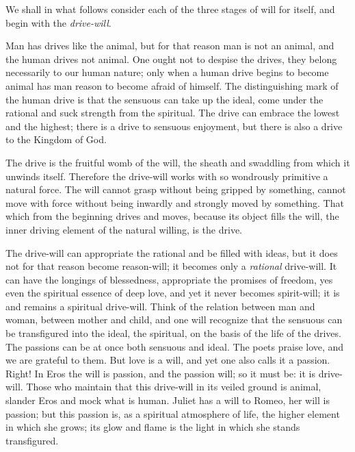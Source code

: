 \documentclass[12pt,a4paper,openany]{book}
\newcommand{\opage}[1]{\marginnote{\footnotesize\textit{[#1]}}}
\begin{document}
We shall in what follows consider each of the three
stages of will for itself, and begin with the \emph{drive-will}.

Man has drives like the animal, but for that reason
man is not an animal, and the human drives not
animal. One ought not to despise the drives, they belong necessarily
to our human nature; only when a human
drive begins to become animal has man reason
to become afraid of himself. The distinguishing mark of the human
drive is that the sensuous can take up the ideal,
come under the rational and suck strength from the spiritual.
The drive can embrace the lowest and the highest; there
is a drive to sensuous enjoyment, but there is also
a drive to the Kingdom of God.

The drive is the fruitful womb of the will, the sheath and
swaddling from which it unwinds itself. Therefore the drive-will works
with so wondrously primitive a natural force. The will cannot
grasp without being gripped by something, cannot move
\setcounter{footnote}{0}%
\opage{17}with force without being inwardly and strongly moved by
something. That which from the beginning drives and moves,
because its object fills the will, the inner driving element of the natural willing,
is the drive.

The drive-will can appropriate the rational and be filled
with ideas, but it does not for that reason become reason-will; it
becomes only a \emph{rational} drive-will. It can have
the longings of blessedness, appropriate the promises of freedom, yes
even the spiritual essence of deep love, and yet it
never becomes spirit-will; it is and remains a spiritual drive-will.
Think of the relation between man and woman,
between mother and child, and one will recognize that the sensuous
can be transfigured into the ideal, the spiritual, on the basis
of the life of the drives. The passions can be at once
both sensuous and ideal. The poets praise love,
and we are grateful to them. But love is a
will, and yet one also calls it a passion. Right!
In Eros the will is passion, and the passion will;
so it must be: it is drive-will. Those who maintain
that this drive-will in its veiled ground is animal, slander
Eros and mock what is human. Juliet has a will
to Romeo, her will is passion; but this passion
is, as a spiritual atmosphere of life, the higher element in which she
grows; its glow and flame is the light in which she stands
transfigured.
\end{document}

